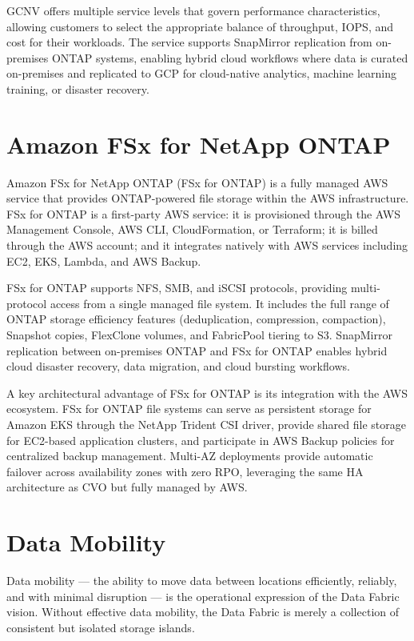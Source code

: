 GCNV offers multiple service levels that govern performance characteristics, allowing customers to select the appropriate balance of throughput, IOPS, and cost for their workloads. The service supports SnapMirror replication from on-premises ONTAP systems, enabling hybrid cloud workflows where data is curated on-premises and replicated to GCP for cloud-native analytics, machine learning training, or disaster recovery.

\section{Amazon FSx for NetApp ONTAP}

Amazon FSx for NetApp ONTAP (FSx for ONTAP) is a fully managed AWS service that provides ONTAP-powered file storage within the AWS infrastructure. FSx for ONTAP is a first-party AWS service: it is provisioned through the AWS Management Console, AWS CLI, CloudFormation, or Terraform; it is billed through the AWS account; and it integrates natively with AWS services including EC2, EKS, Lambda, and AWS Backup.

FSx for ONTAP supports NFS, SMB, and iSCSI protocols, providing multi-protocol access from a single managed file system. It includes the full range of ONTAP storage efficiency features (deduplication, compression, compaction), Snapshot copies, FlexClone volumes, and FabricPool tiering to S3. SnapMirror replication between on-premises ONTAP and FSx for ONTAP enables hybrid cloud disaster recovery, data migration, and cloud bursting workflows.

A key architectural advantage of FSx for ONTAP is its integration with the AWS ecosystem. FSx for ONTAP file systems can serve as persistent storage for Amazon EKS through the NetApp Trident CSI driver, provide shared file storage for EC2-based application clusters, and participate in AWS Backup policies for centralized backup management. Multi-AZ deployments provide automatic failover across availability zones with zero RPO, leveraging the same HA architecture as CVO but fully managed by AWS.

\section{Data Mobility}

Data mobility --- the ability to move data between locations efficiently, reliably, and with minimal disruption --- is the operational expression of the Data Fabric vision. Without effective data mobility, the Data Fabric is merely a collection of consistent but isolated storage islands.

